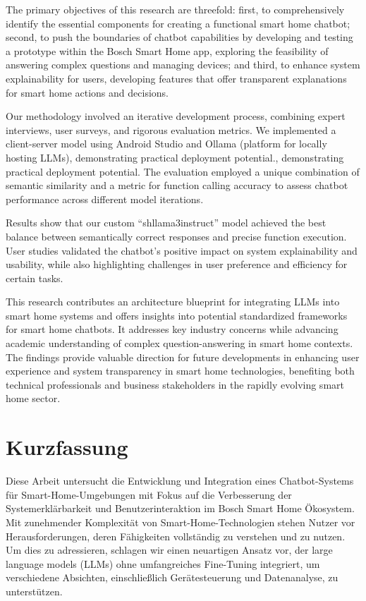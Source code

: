 \documentclass[
  a4paper,  %
  twoside,  %
  bibliography=totoc,
  headsepline,
  cleardoublepage=empty,
  parskip=half,
  draft=false
]{scrbook}
\begin{document}
The primary objectives of this research are threefold: first, to comprehensively identify the essential components for creating a functional smart home chatbot; second, to push the boundaries of chatbot capabilities by developing and testing a prototype within the Bosch Smart Home app, exploring the feasibility of answering complex questions and managing devices; and third, to enhance system explainability for users, developing features that offer transparent explanations for smart home actions and decisions.

Our methodology involved an iterative development process, combining expert interviews, user surveys, and rigorous evaluation metrics. We implemented a client-server model using Android Studio and Ollama (platform for locally hosting LLMs), demonstrating practical deployment potential., demonstrating practical deployment potential. The evaluation employed a unique combination of semantic similarity and a metric for function calling accuracy to assess chatbot performance across different model iterations.

Results show that our custom ``shllama3instruct'' model achieved the best balance between semantically correct responses and precise function execution. User studies validated the chatbot's positive impact on system explainability and usability, while also highlighting challenges in user preference and efficiency for certain tasks.

This research contributes an architecture blueprint for integrating LLMs into smart home systems and offers insights into potential standardized frameworks for smart home chatbots. It addresses key industry concerns while advancing academic understanding of complex question-answering in smart home contexts. The findings provide valuable direction for future developments in enhancing user experience and system transparency in smart home technologies, benefiting both technical professionals and business stakeholders in the rapidly evolving smart home sector.
\cleardoublepage

\section*{Kurzfassung}
Diese Arbeit untersucht die Entwicklung und Integration eines Chatbot-Systems für Smart-Home-Umgebungen mit Fokus auf die Verbesserung der Systemerklärbarkeit und Benutzerinteraktion im Bosch Smart Home Ökosystem. Mit zunehmender Komplexität von Smart-Home-Technologien stehen Nutzer vor Herausforderungen, deren Fähigkeiten vollständig zu verstehen und zu nutzen. Um dies zu adressieren, schlagen wir einen neuartigen Ansatz vor, der large language models (LLMs) ohne umfangreiches Fine-Tuning integriert, um verschiedene Absichten, einschließlich Gerätesteuerung und Datenanalyse, zu unterstützen.
\end{document}
